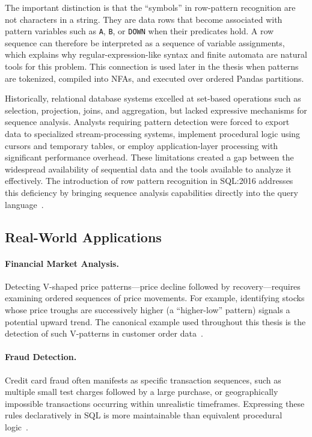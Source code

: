 The important distinction is that the ``symbols'' in row-pattern
recognition are not characters in a string.  They are data rows that
become associated with pattern variables such as \texttt{A},
\texttt{B}, or \texttt{DOWN} when their predicates hold.  A row
sequence can therefore be interpreted as a sequence of variable
assignments, which explains why regular-expression-like syntax and
finite automata are natural tools for this problem.  This connection
is used later in the thesis when patterns are tokenized, compiled
into NFAs, and executed over ordered Pandas partitions.

Historically, relational database systems excelled at set-based
operations such as selection, projection, joins, and aggregation,
but lacked expressive mechanisms for sequence analysis.  Analysts
requiring pattern detection were forced to export data to specialized
stream-processing systems, implement procedural logic using cursors
and temporary tables, or employ application-layer processing with
significant performance overhead.  These limitations created a gap
between the widespread availability of sequential data and the tools
available to analyze it effectively.  The introduction of row pattern
recognition in SQL:2016 addresses this deficiency by bringing
sequence analysis capabilities directly into the query
language~\cite{ISO2016SQL}.

\subsection{Real-World Applications}
\label{subsec:bg-applications}

\paragraph{Financial Market Analysis.}
Detecting V-shaped price patterns---price decline followed by
recovery---requires examining ordered sequences of price movements.
For example, identifying stocks whose price troughs are successively
higher (a ``higher-low'' pattern) signals a potential upward trend.
The canonical example used throughout this thesis is the detection
of such V-patterns in customer order data~\cite{OracleMR}.

\paragraph{Fraud Detection.}
Credit card fraud often manifests as specific transaction sequences,
such as multiple small test charges followed by a large purchase, or
geographically impossible transactions occurring within unrealistic
timeframes.  Expressing these rules declaratively in SQL is more
maintainable than equivalent procedural logic~\cite{petkovic2022fraud}.

